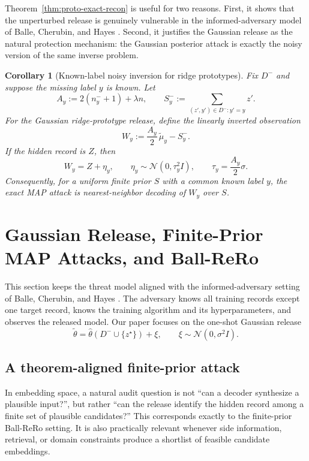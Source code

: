 \documentclass[conference,compsoc]{IEEEtran}
\newtheorem{corollary}{Corollary}
\begin{document}
Theorem~\ref{thm:proto-exact-recon} is useful for two reasons. First, it shows that the unperturbed release is genuinely vulnerable in the informed-adversary model of Balle, Cherubin, and Hayes \cite{balle2022informed}. Second, it justifies the Gaussian release as the natural protection mechanism: the Gaussian posterior attack is exactly the noisy version of the same inverse problem.

\begin{corollary}[Known-label noisy inversion for ridge prototypes]
\label{cor:ridge-noisy-inversion}
Fix $D^-$ and suppose the missing label $y$ is known. Let
\[
A_y:=2(n_y^-+1)+\lambda n,
\qquad
S_y^-:=\sum_{(z',y')\in D^-:y'=y}z'.
\]
For the Gaussian ridge-prototype release, define the linearly inverted observation
\[
W_y:=\frac{A_y}{2}\,\widetilde\mu_y-S_y^-.
\]
If the hidden record is $Z$, then
\[
W_y=Z+\eta_y,
\qquad
\eta_y\sim\mathcal N\!\left(0,\tau_y^2 I\right),
\qquad
\tau_y=\frac{A_y}{2}\sigma.
\]
Consequently, for a uniform finite prior $S$ with a common known label $y$, the exact MAP attack is nearest-neighbor decoding of $W_y$ over $S$.
\end{corollary}

\section{Gaussian Release, Finite-Prior MAP Attacks, and Ball-ReRo}
\label{sec:gaussian-rero}

This section keeps the threat model aligned with the informed-adversary setting of Balle, Cherubin, and Hayes \cite{balle2022informed}. The adversary knows all training records except one target record, knows the training algorithm and its hyperparameters, and observes the released model. Our paper focuses on the one-shot Gaussian release
\[
\widetilde\theta = \widehat\theta(D^-\cup\{z^\star\})+\xi,
\qquad
\xi\sim\mathcal{N}(0,\sigma^2 I).
\]

\subsection{A theorem-aligned finite-prior attack}

In embedding space, a natural audit question is not ``can a decoder synthesize a plausible input?'', but rather ``can the release identify the hidden record among a finite set of plausible candidates?'' This corresponds exactly to the finite-prior Ball-ReRo setting. It is also practically relevant whenever side information, retrieval, or domain constraints produce a shortlist of feasible candidate embeddings.
\end{document}
